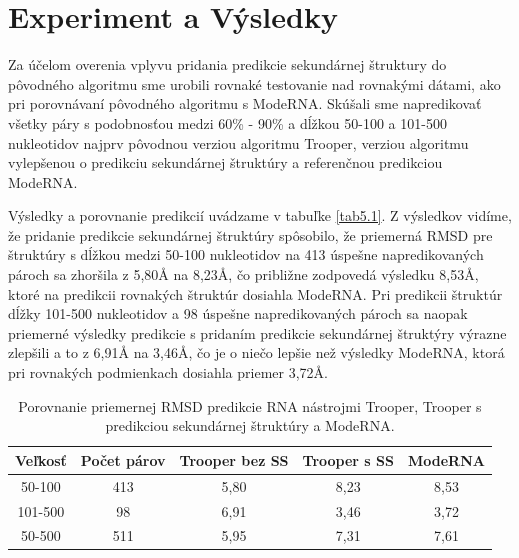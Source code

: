 \section{Experiment a Výsledky}
Za účelom overenia vplyvu pridania predikcie sekundárnej štruktury do pôvodného algoritmu sme urobili rovnaké testovanie nad rovnakými dátami, ako pri porovnávaní pôvodného algoritmu s ModeRNA. Skúšali sme napredikovať všetky páry s podobnosťou medzi 60\% - 90\% a dĺžkou 50-100 a 101-500 nukleotidov najprv pôvodnou verziou algoritmu Trooper, verziou algoritmu vylepšenou o predikciu sekundárnej štruktúry a referenčnou predikciou ModeRNA. 


\indent  Výsledky a porovnanie predikcií uvádzame v tabuľke \autoref{tab5.1}. Z výsledkov vidíme, že pridanie predikcie sekundárnej štruktúry spôsobilo, že priemerná RMSD pre štruktúry s dĺžkou medzi 50-100 nukleotidov na 413 úspešne napredikovaných pároch sa zhoršila z 5,80Å na 8,23Å, čo približne zodpovedá výsledku 8,53Å, ktoré na predikcii rovnakých štruktúr dosiahla ModeRNA. Pri predikcii štruktúr dĺžky 101-500 nukleotidov a 98 úspešne napredikovaných pároch sa naopak priemerné výsledky predikcie s pridaním predikcie sekundárnej štruktýry výrazne zlepšili a to z 6,91Å na 3,46Å, čo je o niečo lepšie než výsledky ModeRNA, ktorá pri rovnakých podmienkach dosiahla priemer 3,72Å. 
\begin{table}[b!]
\centering
\begin{tabular}{ccccc}
\toprule
Veľkosť & Počet párov & Trooper bez SS & Trooper s SS & ModeRNA\\
\midrule
50-100  & 413 & 5,80  & 8,23 & 8,53\\
101-500  & 98 & 6,91  & 3,46 & 3,72\\
\bottomrule
50-500  &  511 & 5,95  & 7,31 & 7,61\\
\end{tabular}
\caption{Porovnanie priemernej RMSD predikcie RNA nástrojmi Trooper, Trooper s predikciou sekundárnej štruktúry a ModeRNA. }\label{tab5.1}
\end{table}



